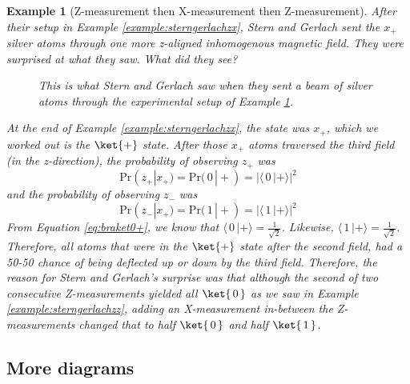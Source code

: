 \documentclass{article}
\newtheorem{example}{Example}
\newcommand{\abs}[1]{{\big\vert} #1 {\big\vert}}
\newcommand{\kz}[1]{\ket{\,#1\,}}
\newcommand{\kx}[1]{\ket{#1}}
\begin{document}
\begin{example}[Z-measurement then X-measurement then Z-measurement] \label{example:sterngerlachzxz}
	After their setup in Example \ref{example:sterngerlachzx}, Stern and Gerlach sent the $x_+$ silver atoms through one more z-aligned inhomogenous magnetic field.  They were surprised at what they saw.  What did they see?
	
	\begin{figure}[h!]
		\caption{This is what Stern and Gerlach saw when they sent a beam of silver atoms through the experimental setup of Example \ref{example:sterngerlachzxz}.}
	\end{figure}

	\textnormal{At the end of Example \ref{example:sterngerlachzx}, the state was $x_+$, which we worked out is the $\kx+$ state.  After those $x_+$ atoms traversed the third field (in the z-direction), the probability of observing $z_+$ was
	\begin{equation}
		\text{Pr}(z_+|x_+) = \text{Pr}(\,0\,|+) = \abs{\langle\,0\,|+\rangle}^2
	\end{equation}
	and the probability of observing $z_-$ was
	\begin{equation}
		\text{Pr}(z_-|x_+) = \text{Pr}(\,1\,|+) = \abs{\langle\,1\,|+\rangle}^2
	\end{equation}
	From Equation \ref{eq:braket0+}, we know that $\langle\,0\,|+\rangle = \frac{1}{\sqrt{2}}$.  Likewise, $\langle\,1\,|+\rangle = \frac{1}{\sqrt{2}}$.  Therefore, all atoms that were in the $\kx+$ state after the second field, had a 50-50 chance of being deflected up or down by the third field.  Therefore, the reason for Stern and Gerlach's surprise was that although the second of two consecutive Z-measurements yielded all $\kz0$ as we saw in Example \ref{example:sterngerlachzz}, adding an X-measurement in-between the Z-measurements changed that to half $\kz0$ and half $\kz1$.}
\end{example}


\subsection{More diagrams}
\end{document}
